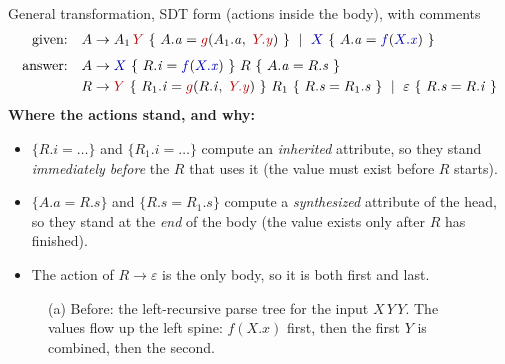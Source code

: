\documentclass[11pt,a4paper]{article}
\newcommand{\at}[2]{\ensuremath{#1.\mathit{#2}}}
\begin{document}
\begin{defbox}{General transformation, SDT form (actions inside the body), with comments}
\begin{align*}
\text{given:}\quad A &\to A_1\,\cgy{Y}\ \{\ \at{A}{a}=\cgy{g}(\at{A_1}{a},\ \cgy{\at{Y}{y}})\ \}\ \mid\ \cfx{X}\ \{\ \at{A}{a}=\cfx{f}(\cfx{\at{X}{x}})\ \}\\[4pt]
\text{answer:}\quad A &\to \cfx{X}\ \{\ \at{R}{i}=\cfx{f}(\cfx{\at{X}{x}})\ \}\ R\ \{\ \at{A}{a}=\at{R}{s}\ \}\\
R &\to \cgy{Y}\ \{\ \at{R_1}{i}=\cgy{g}(\at{R}{i},\ \cgy{\at{Y}{y}})\ \}\ R_1\ \{\ \at{R}{s}=\at{R_1}{s}\ \}\ \mid\ \varepsilon\ \{\ \at{R}{s}=\at{R}{i}\ \}
\end{align*}
\textbf{Where the actions stand, and why:}
\begin{itemize}[nosep]
\item $\{R.i=\dots\}$ and $\{R_1.i=\dots\}$ compute an \emph{inherited} attribute, so they stand \emph{immediately before} the $R$ that uses it (the value must exist before $R$ starts).
\item $\{A.a=R.s\}$ and $\{R.s=R_1.s\}$ compute a \emph{synthesized} attribute of the head, so they stand at the \emph{end} of the body (the value exists only after $R$ has finished).
\item The action of $R\to\varepsilon$ is the only body, so it is both first and last.
\end{itemize}
\end{defbox}

\begin{figure}[H]
\centering
{}
\caption{(a) Before: the left-recursive parse tree for the input $X\,Y\,Y$. The values flow \textcolor{red!70!black}{up} the left spine: $f(X.x)$ first, then the first $Y$ is combined, then the second.}
\label{fig:lrflow}
\end{figure}
\end{document}
